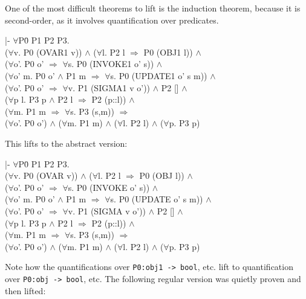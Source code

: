 \documentclass[envcountsame,runningheads]{llncs}
\begin{document}
One of the most difficult theorems to lift is the induction theorem,
because it is second-order, as it involves quantification over predicates.
{\tt \begin{tabbing}
|- $\forall$P\=0 P1 P2 P3. \\
\>   ($\forall$v. P0 (OVAR1 v)) $\wedge$ ($\forall$l. P2 l $\Rightarrow$ P0 (OBJ1 l)) $\wedge$ \\
\>   ($\forall$o'. P0 o' $\Rightarrow$ $\forall$s. P0 (INVOKE1 o' s)) $\wedge$ \\
\>   ($\forall$o' m. P0 o' $\wedge$ P1 m $\Rightarrow$ $\forall$s. P0 (UPDATE1 o' s m)) $\wedge$ \\
\>   ($\forall$o'. P0 o' $\Rightarrow$ $\forall$v. P1 (SIGMA1 v o')) $\wedge$ P2 [] $\wedge$ \\
\>   ($\forall$p l. P3 p $\wedge$ P2 l $\Rightarrow$ P2 (p::l)) $\wedge$ \\
\>   ($\forall$m. P1 m $\Rightarrow$ $\forall$s. P3 (s,m)) $\Rightarrow$ \\
\>   ($\forall$o'. P0 o') $\wedge$ ($\forall$m. P1 m) $\wedge$ ($\forall$l. P2 l) $\wedge$ ($\forall$p. P3 p)
\end{tabbing}}
This lifts to the abstract version:
{\tt \begin{tabbing}
|- $\forall$P\=0 P1 P2 P3. \\
\>   ($\forall$v. P0 (OVAR v)) $\wedge$ ($\forall$l. P2 l $\Rightarrow$ P0 (OBJ l)) $\wedge$ \\
\>   ($\forall$o'. P0 o' $\Rightarrow$ $\forall$s. P0 (INVOKE o' s)) $\wedge$ \\
\>   ($\forall$o' m. P0 o' $\wedge$ P1 m $\Rightarrow$ $\forall$s. P0 (UPDATE o' s m)) $\wedge$ \\
\>   ($\forall$o'. P0 o' $\Rightarrow$ $\forall$v. P1 (SIGMA v o')) $\wedge$ P2 [] $\wedge$ \\
\>   ($\forall$p l. P3 p $\wedge$ P2 l $\Rightarrow$ P2 (p::l)) $\wedge$ \\
\>   ($\forall$m. P1 m $\Rightarrow$ $\forall$s. P3 (s,m)) $\Rightarrow$ \\
\>   ($\forall$o'. P0 o') $\wedge$ ($\forall$m. P1 m) $\wedge$ ($\forall$l. P2 l) $\wedge$ ($\forall$p. P3 p)
\end{tabbing}}
Note how the quantifications over {\tt P0:obj1 -> bool}, etc. lift to
quantification over {\tt P0:obj -> bool}, etc.
The following regular version was quietly proven and then lifted:
\end{document}
